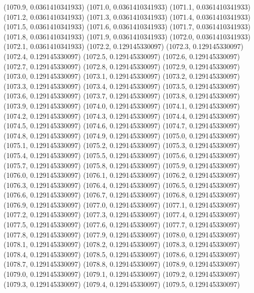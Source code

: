 {					(1070.9, 0.0361410341933)
					(1071.0, 0.0361410341933)
					(1071.1, 0.0361410341933)
					(1071.2, 0.0361410341933)
					(1071.3, 0.0361410341933)
					(1071.4, 0.0361410341933)
					(1071.5, 0.0361410341933)
					(1071.6, 0.0361410341933)
					(1071.7, 0.0361410341933)
					(1071.8, 0.0361410341933)
					(1071.9, 0.0361410341933)
					(1072.0, 0.0361410341933)
					(1072.1, 0.0361410341933)
					(1072.2, 0.129145330097)
					(1072.3, 0.129145330097)
					(1072.4, 0.129145330097)
					(1072.5, 0.129145330097)
					(1072.6, 0.129145330097)
					(1072.7, 0.129145330097)
					(1072.8, 0.129145330097)
					(1072.9, 0.129145330097)
					(1073.0, 0.129145330097)
					(1073.1, 0.129145330097)
					(1073.2, 0.129145330097)
					(1073.3, 0.129145330097)
					(1073.4, 0.129145330097)
					(1073.5, 0.129145330097)
					(1073.6, 0.129145330097)
					(1073.7, 0.129145330097)
					(1073.8, 0.129145330097)
					(1073.9, 0.129145330097)
					(1074.0, 0.129145330097)
					(1074.1, 0.129145330097)
					(1074.2, 0.129145330097)
					(1074.3, 0.129145330097)
					(1074.4, 0.129145330097)
					(1074.5, 0.129145330097)
					(1074.6, 0.129145330097)
					(1074.7, 0.129145330097)
					(1074.8, 0.129145330097)
					(1074.9, 0.129145330097)
					(1075.0, 0.129145330097)
					(1075.1, 0.129145330097)
					(1075.2, 0.129145330097)
					(1075.3, 0.129145330097)
					(1075.4, 0.129145330097)
					(1075.5, 0.129145330097)
					(1075.6, 0.129145330097)
					(1075.7, 0.129145330097)
					(1075.8, 0.129145330097)
					(1075.9, 0.129145330097)
					(1076.0, 0.129145330097)
					(1076.1, 0.129145330097)
					(1076.2, 0.129145330097)
					(1076.3, 0.129145330097)
					(1076.4, 0.129145330097)
					(1076.5, 0.129145330097)
					(1076.6, 0.129145330097)
					(1076.7, 0.129145330097)
					(1076.8, 0.129145330097)
					(1076.9, 0.129145330097)
					(1077.0, 0.129145330097)
					(1077.1, 0.129145330097)
					(1077.2, 0.129145330097)
					(1077.3, 0.129145330097)
					(1077.4, 0.129145330097)
					(1077.5, 0.129145330097)
					(1077.6, 0.129145330097)
					(1077.7, 0.129145330097)
					(1077.8, 0.129145330097)
					(1077.9, 0.129145330097)
					(1078.0, 0.129145330097)
					(1078.1, 0.129145330097)
					(1078.2, 0.129145330097)
					(1078.3, 0.129145330097)
					(1078.4, 0.129145330097)
					(1078.5, 0.129145330097)
					(1078.6, 0.129145330097)
					(1078.7, 0.129145330097)
					(1078.8, 0.129145330097)
					(1078.9, 0.129145330097)
					(1079.0, 0.129145330097)
					(1079.1, 0.129145330097)
					(1079.2, 0.129145330097)
					(1079.3, 0.129145330097)
					(1079.4, 0.129145330097)
					(1079.5, 0.129145330097)
}
